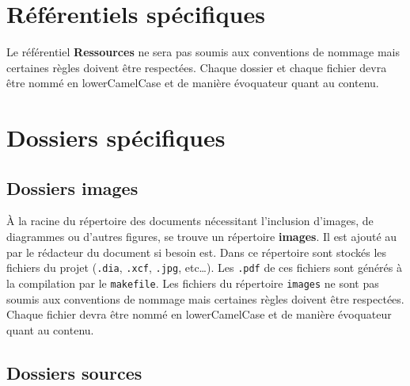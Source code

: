 
\section{Référentiels spécifiques}

Le référentiel \textbf{Ressources} ne sera pas soumis aux conventions de nommage mais certaines règles doivent être respectées. Chaque dossier et chaque fichier devra être nommé en lowerCamelCase et de manière évoquateur quant au contenu. 

\section{Dossiers spécifiques}

\subsection{Dossiers images}

\`{A} la racine du répertoire des documents nécessitant l'inclusion d'images, de diagrammes ou
d'autres figures, se trouve un répertoire \textbf{images}. Il est ajouté au \git{} par le
rédacteur du document si besoin est. Dans ce répertoire sont stockés les fichiers du projet
(\verb+.dia+, \verb+.xcf+, \verb+.jpg+, etc\dots). Les \verb+.pdf+ de ces fichiers sont générés
à la compilation par le \verb+makefile+.
Les fichiers du répertoire \verb+images+ ne sont pas soumis aux conventions de nommage mais certaines règles doivent être respectées. Chaque fichier devra être nommé en lowerCamelCase et de manière évoquateur quant au contenu. 

\subsection{Dossiers sources}

